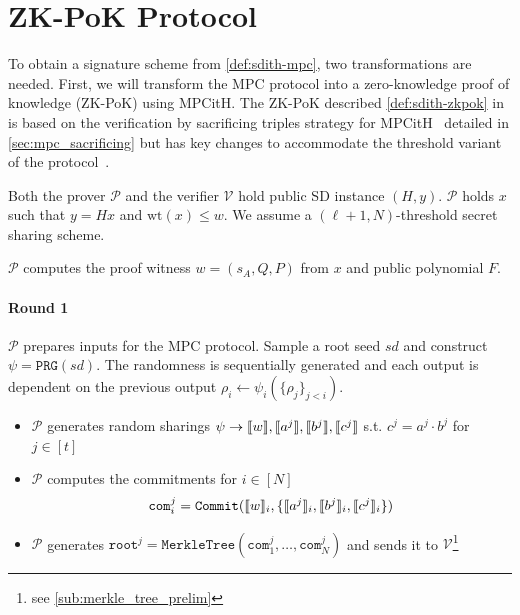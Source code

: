 \documentclass[11pt]{report}
\theoremstyle{definition}
\theoremstyle{plain}
\begin{document}
\section{ZK-PoK Protocol}\label{sec:sdith-zkpok}

To obtain a signature scheme from \autoref{def:sdith-mpc}, two transformations are needed. First, we will transform the MPC protocol into a zero-knowledge proof of knowledge (ZK-PoK) using MPCitH. The ZK-PoK described \autoref{def:sdith-zkpok} in is based on the verification by sacrificing triples strategy for MPCitH~\cite{baum2020concretely} detailed in \autoref{sec:mpc_sacrificing} but has key changes to accommodate the threshold variant of the protocol~\cite{feneuil2023threshold,feneuil2023threshold2}.

\begin{protocol}\label{def:sdith-zkpok}
  \setlength{\parskip}{5pt}
  \setlength{\parindent}{0pt}
  \titlespacing*{\paragraph}{0pt}{1pt}{1em}
  Both the prover $\mathcal{P}$ and the verifier $\mathcal{V}$ hold public SD instance $(H,y)$. $\mathcal{P}$ holds $x$ such that $y = Hx$ and $\text{wt}(x) \leq w$. We assume a $(\ell + 1, N)$-threshold secret sharing scheme.

  $\mathcal{P}$ computes the proof witness $w = (s_A, Q, P)$ from $x$ and public polynomial $F$.

  \paragraph{Round 1}
  $\mathcal{P}$ prepares inputs for the MPC protocol. Sample a root seed $sd$ and construct $\psi = \texttt{PRG}(sd)$. The randomness is sequentially generated and each output is dependent on the previous output $\rho_i \leftarrow \psi_i(\{\rho_j\}_{j < i})$.

  \begin{itemize}[parsep=0pt, itemsep=0pt, topsep=0pt]
    \item $\mathcal{P}$ generates random sharings $\psi \rightarrow \llbracket w \rrbracket, \llbracket a^j \rrbracket, \llbracket b^j \rrbracket, \llbracket c^j \rrbracket$ s.t. $c^j = a^j \cdot b^j$ for $j \in [t]$
    \item $\mathcal{P}$ computes the commitments for $i \in [N]$
          \begin{align*}
            \texttt{com}^j_i = \texttt{Commit}(\llbracket w \rrbracket_i, \{ \llbracket a^j \rrbracket_i, \llbracket b^j \rrbracket_i, \llbracket c^j \rrbracket_i \})
          \end{align*}
    \item $\mathcal{P}$ generates $\texttt{root}^j = \texttt{MerkleTree}(\texttt{com}^j_1, \ldots, \texttt{com}^j_N)$ and sends it to $\mathcal{V}$\footnote{see \autoref{sub:merkle_tree_prelim}}
  \end{itemize}


\end{protocol}
\end{document}
